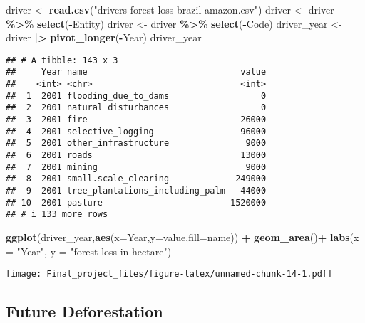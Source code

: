 \documentclass[
]{article}
\newenvironment{Shaded}{\begin{snugshade}}{\end{snugshade}}
\newcommand{\AttributeTok}[1]{\textcolor[rgb]{0.13,0.29,0.53}{#1}}
\newcommand{\FunctionTok}[1]{\textcolor[rgb]{0.13,0.29,0.53}{\textbf{#1}}}
\newcommand{\NormalTok}[1]{#1}
\newcommand{\OtherTok}[1]{\textcolor[rgb]{0.56,0.35,0.01}{#1}}
\newcommand{\SpecialCharTok}[1]{\textcolor[rgb]{0.81,0.36,0.00}{\textbf{#1}}}
\newcommand{\StringTok}[1]{\textcolor[rgb]{0.31,0.60,0.02}{#1}}
\begin{document}
\begin{Shaded}
\begin{Highlighting}[]
\NormalTok{driver }\OtherTok{\textless{}{-}} \FunctionTok{read.csv}\NormalTok{(}\StringTok{"drivers{-}forest{-}loss{-}brazil{-}amazon.csv"}\NormalTok{)}
\NormalTok{driver }\OtherTok{\textless{}{-}}\NormalTok{ driver }\SpecialCharTok{\%\textgreater{}\%} \FunctionTok{select}\NormalTok{(}\SpecialCharTok{{-}}\NormalTok{Entity)}
\NormalTok{driver }\OtherTok{\textless{}{-}}\NormalTok{ driver }\SpecialCharTok{\%\textgreater{}\%} \FunctionTok{select}\NormalTok{(}\SpecialCharTok{{-}}\NormalTok{Code)}
\NormalTok{driver\_year }\OtherTok{\textless{}{-}}\NormalTok{ driver }\SpecialCharTok{|\textgreater{}} \FunctionTok{pivot\_longer}\NormalTok{(}\SpecialCharTok{{-}}\NormalTok{Year)}
\NormalTok{driver\_year}
\end{Highlighting}
\end{Shaded}

\begin{verbatim}
## # A tibble: 143 x 3
##     Year name                              value
##    <int> <chr>                             <int>
##  1  2001 flooding_due_to_dams                  0
##  2  2001 natural_disturbances                  0
##  3  2001 fire                              26000
##  4  2001 selective_logging                 96000
##  5  2001 other_infrastructure               9000
##  6  2001 roads                             13000
##  7  2001 mining                             9000
##  8  2001 small.scale_clearing             249000
##  9  2001 tree_plantations_including_palm   44000
## 10  2001 pasture                         1520000
## # i 133 more rows
\end{verbatim}

\begin{Shaded}
\begin{Highlighting}[]
\FunctionTok{ggplot}\NormalTok{(driver\_year,}\FunctionTok{aes}\NormalTok{(}\AttributeTok{x=}\NormalTok{Year,}\AttributeTok{y=}\NormalTok{value,}\AttributeTok{fill=}\NormalTok{name)) }\SpecialCharTok{+} \FunctionTok{geom\_area}\NormalTok{()}\SpecialCharTok{+} \FunctionTok{labs}\NormalTok{(}\AttributeTok{x =} \StringTok{"Year"}\NormalTok{, }\AttributeTok{y =} \StringTok{"forest loss in hectare"}\NormalTok{)}
\end{Highlighting}
\end{Shaded}

\texttt{[image: Final\_project\_files/figure-latex/unnamed-chunk-14-1.pdf]}

\hypertarget{future-deforestation}{%
\subsection{Future Deforestation}\label{future-deforestation}}
\end{document}

